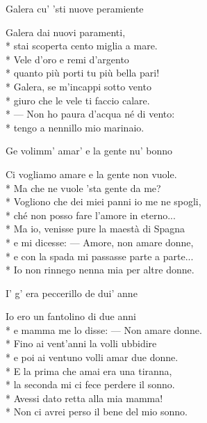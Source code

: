 \documentclass[11pt]{book}
\begin{document}
\begin{poem}{Galera cu’ ’sti nuove peramiente}{}
\settowidth{\versewidth}{— Non ho paura d’acqua né di vento}
\begin{altverse}
Galera dai nuovi paramenti,\\*
stai scoperta cento miglia a mare.\\*
Vele d’oro e remi d’argento\\*
quanto più porti tu più bella pari!\\*
Galera, se m’incappi sotto vento\\*
giuro che le vele ti faccio calare.\\*
— Non ho paura d’acqua né di vento:\\*
tengo a nennillo mio marinaio.
\end{altverse}
\end{poem}

\begin{poem}{Ge volimm’ amar’ e la gente nu’ bonno}{}
\settowidth{\versewidth}{Vogliono che dei miei panni io me ne spogli}
\begin{altverse}
Ci vogliamo amare e la gente non vuole.\\*
Ma che ne vuole ’sta gente da me?\\*
Vogliono che dei miei panni io me ne spogli,\\*
ché non posso fare l’amore in eterno...\\*
Ma io, venisse pure la maestà di Spagna\\*
e mi dicesse: — Amore, non amare donne,\\*
e con la spada mi passasse parte a parte...\\*
Io non rinnego nenna mia per altre donne.
\end{altverse}
\end{poem}

\begin{poem}{I’ g’ era peccerillo de dui’ anne}{}
\settowidth{\versewidth}{Non ci avrei perso il bene del mio sonno}
\begin{altverse}
Io ero un fantolino di due anni\\*
e mamma me lo disse: — Non amare donne.\\*
Fino ai vent’anni la volli ubbidire\\*
e poi ai ventuno volli amar due donne.\\*
E la prima che amai era una tiranna,\\*
la seconda mi ci fece perdere il sonno.\\*
Avessi dato retta alla mia mamma!\\*
Non ci avrei perso il bene del mio sonno.
\end{altverse}
\end{poem}
\end{document}
